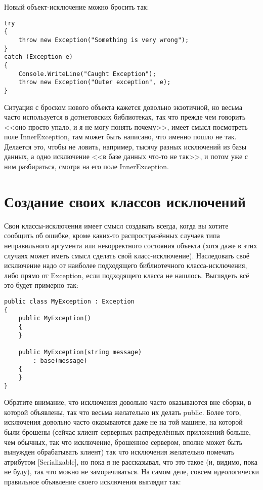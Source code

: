 \documentclass[a5paper]{article}
\begin{document}
Новый объект-исключение можно бросить так:

\begin{verbatim}
try
{
    throw new Exception("Something is very wrong");
}
catch (Exception e)
{
    Console.WriteLine("Caught Exception");
    throw new Exception("Outer exception", e);
}
\end{verbatim}

Ситуация с броском нового объекта кажется довольно экзотичной, но весьма часто используется в дотнетовских библиотеках, так что прежде чем говорить <<оно просто упало, и я не могу понять почему>>, имеет смысл посмотреть поле InnerException, там может быть написано, что именно пошло не так. Делается это, чтобы не ловить, например, тысячу разных исключений из базы данных, а одно исключение <<в базе данных что-то не так>>, и потом уже с ним разбираться, смотря на его поле InnerException.

\section{Создание своих классов исключений}

Свои классы-исключения имеет смысл создавать всегда, когда вы хотите сообщить об ошибке, кроме каких-то распространённых случаев типа неправильного аргумента или некорректного состояния объекта (хотя даже в этих случаях может иметь смысл сделать свой класс-исключение). Наследовать своё исключение надо от наиболее подходящего библиотечного класса-исключения, либо прямо от Exception, если подходящего класса не нашлось. Выглядеть всё это будет примерно так:

\begin{verbatim}
public class MyException : Exception
{
    public MyException() 
    {
    }

    public MyException(string message)
        : base(message)
    {
    }
}
\end{verbatim}

Обратите внимание, что исключения довольно часто оказываются вне сборки, в которой объявлены, так что весьма желательно их делать public. Более того, исключения довольно часто оказываются даже не на той машине, на которой были брошены (сейчас клиент-серверных распределённых приложений больше, чем обычных, так что исключение, брошенное сервером, вполне может быть вынужден обрабатывать клиент) так что исключения желательно помечать атрибутом [Serializable], но пока я не рассказывал, что это такое (и, видимо, пока не буду), так что можно не заморачиваться. На самом деле, совсем идеологически правильное объявление своего исключения выглядит так:
\end{document}
